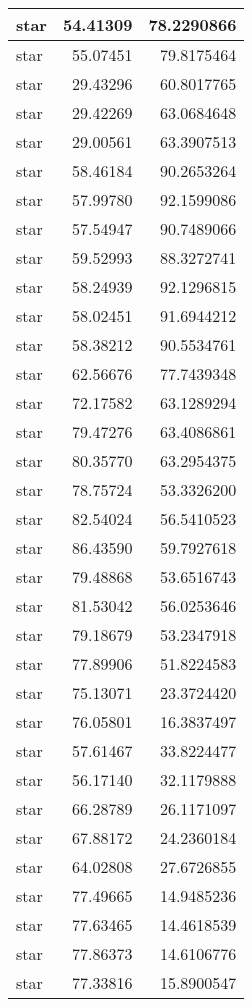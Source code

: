 \documentclass[
]{book}
\theoremstyle{definition}
\theoremstyle{definition}
\theoremstyle{definition}
\theoremstyle{definition}
\theoremstyle{remark}
\begin{document}
\begin{tabular}{l|r|r}
\hline
star & 54.41309 & 78.2290866\\
\hline
star & 55.07451 & 79.8175464\\
\hline
star & 29.43296 & 60.8017765\\
\hline
star & 29.42269 & 63.0684648\\
\hline
star & 29.00561 & 63.3907513\\
\hline
star & 58.46184 & 90.2653264\\
\hline
star & 57.99780 & 92.1599086\\
\hline
star & 57.54947 & 90.7489066\\
\hline
star & 59.52993 & 88.3272741\\
\hline
star & 58.24939 & 92.1296815\\
\hline
star & 58.02451 & 91.6944212\\
\hline
star & 58.38212 & 90.5534761\\
\hline
star & 62.56676 & 77.7439348\\
\hline
star & 72.17582 & 63.1289294\\
\hline
star & 79.47276 & 63.4086861\\
\hline
star & 80.35770 & 63.2954375\\
\hline
star & 78.75724 & 53.3326200\\
\hline
star & 82.54024 & 56.5410523\\
\hline
star & 86.43590 & 59.7927618\\
\hline
star & 79.48868 & 53.6516743\\
\hline
star & 81.53042 & 56.0253646\\
\hline
star & 79.18679 & 53.2347918\\
\hline
star & 77.89906 & 51.8224583\\
\hline
star & 75.13071 & 23.3724420\\
\hline
star & 76.05801 & 16.3837497\\
\hline
star & 57.61467 & 33.8224477\\
\hline
star & 56.17140 & 32.1179888\\
\hline
star & 66.28789 & 26.1171097\\
\hline
star & 67.88172 & 24.2360184\\
\hline
star & 64.02808 & 27.6726855\\
\hline
star & 77.49665 & 14.9485236\\
\hline
star & 77.63465 & 14.4618539\\
\hline
star & 77.86373 & 14.6106776\\
\hline
star & 77.33816 & 15.8900547\\

\end{tabular}
\end{document}

